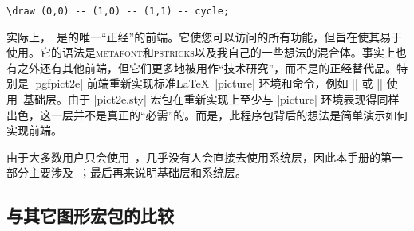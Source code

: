 \begin{verbatim}
\draw (0,0) -- (1,0) -- (1,1) -- cycle;
\end{verbatim}


实际上，\tikzname\ 是\pgfname 的唯一``正经''的前端。它使您可以访问\pgfname 的所有功能，但旨在使其易于使用。它的语法是\textsc{metafont}和\textsc{pstricks}以及我自己的一些想法的混合体。事实上也有\tikzname 之外还有其他前端，但它们更多地被用作``技术研究''，而不是\tikzname 的正经替代品。特别是 |pgfpict2e| 前端重新实现标准\LaTeX\ |{picture}| 环境和命令，例如 |\line| 或 |\vector| 使用\pgfname\ 基础层。由于 |pict2e.sty| 宏包在重新实现上至少与 |{picture}| 环境表现得同样出色，这一层并不是真正的“必需”的。而是，此程序包背后的想法是简单演示如何实现前端。


由于大多数用户只会使用\tikzname\ ，几乎没有人会直接去使用系统层，因此本手册的第一部分主要涉及\tikzname\ ；最后再来说明基础层和系统层。

\subsection{与其它图形宏包的比较}


